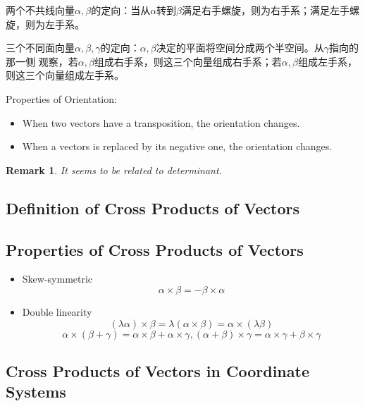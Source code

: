 \documentclass[onecolumn]{ctexart}
\newtheorem{remark}{Remark}
\begin{document}
两个不共线向量$\alpha, \beta$的定向：当从$\alpha$转到$\beta$满足右手螺旋，则为右手系；满足左手螺旋，则为左手系。

三个不同面向量$\alpha, \beta, \gamma$的定向：$\alpha, \beta$决定的平面将空间分成两个半空间。从$\gamma$指向的那一侧
观察，若$\alpha, \beta$组成右手系，则这三个向量组成右手系；若$\alpha, \beta$组成左手系，则这三个向量组成左手系。

Properties of Orientation:
\begin{itemize}
  \item When two vectors have a transposition, the orientation changes.
  \item When a vectors is replaced by its negative one, the orientation changes.
\end{itemize}

\begin{remark}
  It seems to be related to determinant.
\end{remark}

\subsection{Definition of Cross Products of Vectors}

\subsection{Properties of Cross Products of Vectors}

\begin{itemize}
  \item Skew-symmetric
  \begin{equation}
    \alpha \times \beta = - \beta \times \alpha
  \end{equation}
  \item Double linearity
  \begin{equation}
    (\lambda \alpha) \times \beta = \lambda (\alpha \times \beta) = \alpha \times (\lambda \beta)
  \end{equation}
  \begin{equation}
    \alpha \times (\beta + \gamma) = \alpha \times \beta + \alpha \times \gamma, (\alpha + \beta) \times \gamma = \alpha \times \gamma + \beta \times \gamma
  \end{equation}
\end{itemize}

\subsection{Cross Products of Vectors in Coordinate Systems}
\end{document}
